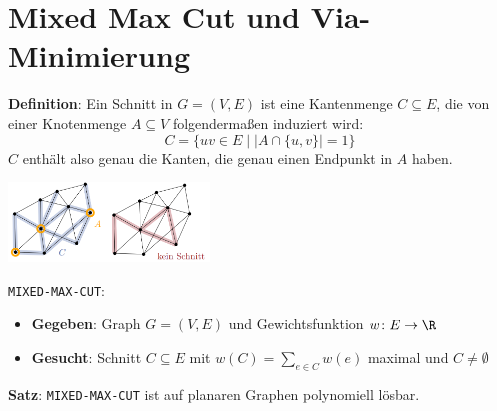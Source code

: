 \section{Mixed Max Cut und Via-Minimierung}

\textbf{Definition}: Ein Schnitt in $G=(V,E)$ ist eine Kantenmenge $C\subseteq E$, die von einer Knotenmenge $A\subseteq V$ folgendermaßen induziert wird:
$$C=\{uv\in E\mid |A\cap\{u,v\}|=1\}$$
$C$ enthält also genau die Kanten, die genau einen Endpunkt in $A$ haben.\\

\begin{center}
	\includegraphics[width=0.4\textwidth]{images/cut.png}
\end{center}
\pagebreak

\texttt{MIXED-MAX-CUT}: 
\begin{itemize}
	\item \textbf{Gegeben}: Graph $G=(V,E)$ und Gewichtsfunktion $w\colon E\rightarrow\R$
	\item \textbf{Gesucht}: Schnitt $C\subseteq E$ mit $w(C)=\sum\limits_{e\in C} w(e)$ maximal und $C\neq\emptyset$
\end{itemize}
\bigskip
\textbf{Satz}: \texttt{MIXED-MAX-CUT} ist auf planaren Graphen polynomiell lösbar.


